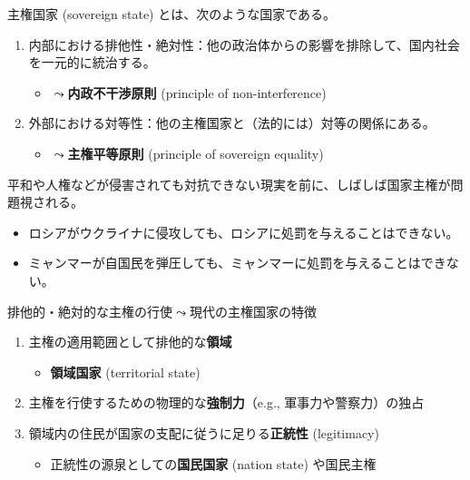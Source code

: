 \documentclass[
  xelatex,
  ja=standard]{bxjsarticle}
\providecommand{\tightlist}{%
  \setlength{\itemsep}{0pt}\setlength{\parskip}{0pt}}\usepackage{longtable,booktabs,array}
\begin{document}
主権国家 (sovereign state) とは、次のような国家である。

\begin{enumerate}
\def\labelenumi{\arabic{enumi}.}
\tightlist
\item
  内部における排他性・絶対性：他の政治体からの影響を排除して、国内社会を一元的に統治する。

  \begin{itemize}
  \tightlist
  \item
    \(\leadsto\)\textbf{内政不干渉原則} (principle of non-interference)
  \end{itemize}
\item
  外部における対等性：他の主権国家と（法的には）対等の関係にある。

  \begin{itemize}
  \tightlist
  \item
    \(\leadsto\)\textbf{主権平等原則} (principle of sovereign equality)
  \end{itemize}
\end{enumerate}

平和や人権などが侵害されても対抗できない現実を前に、しばしば国家主権が問題視される。

\begin{itemize}
\tightlist
\item
  ロシアがウクライナに侵攻しても、ロシアに処罰を与えることはできない。
\item
  ミャンマーが自国民を弾圧しても、ミャンマーに処罰を与えることはできない。
\end{itemize}

排他的・絶対的な主権の行使\(\leadsto\)現代の主権国家の特徴
\citep{sunahara2020}

\begin{enumerate}
\def\labelenumi{\arabic{enumi}.}
\tightlist
\item
  主権の適用範囲として排他的な\textbf{領域}

  \begin{itemize}
  \tightlist
  \item
    \textbf{領域国家} (territorial state)
  \end{itemize}
\item
  主権を行使するための物理的な\textbf{強制力}（e.g.,
  軍事力や警察力）の独占
\item
  領域内の住民が国家の支配に従うに足りる\textbf{正統性} (legitimacy)

  \begin{itemize}
  \tightlist
  \item
    正統性の源泉としての\textbf{国民国家} (nation state) や国民主権
  \end{itemize}
\end{enumerate}
\end{document}
